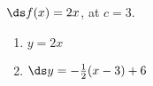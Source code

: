 {$\ds f(x) = 2x$, at $c=3$.
}
{\begin{enumerate}
\item		$y = 2x$
\item		$\ds y = -\frac{1}{2}(x-3)+6$
\end{enumerate}
}
